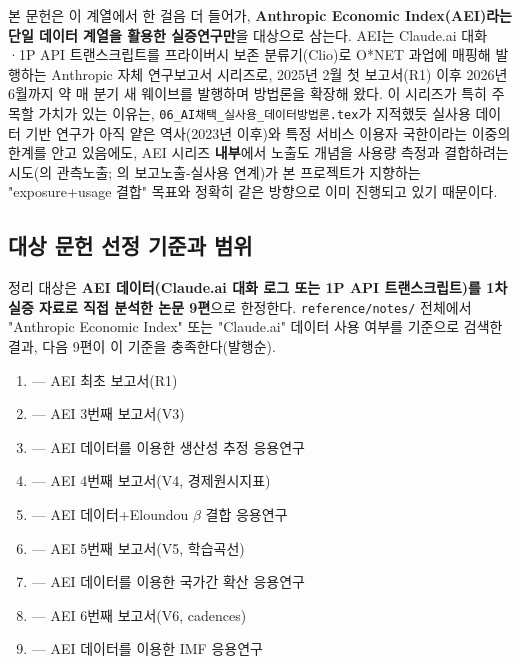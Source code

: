 \documentclass[11pt]{article}
\begin{document}
본 문헌은 이 계열에서 한 걸음 더 들어가, \textbf{Anthropic Economic Index(AEI)라는 단일 데이터 계열을 활용한 실증연구만}을 대상으로 삼는다. AEI는 Claude.ai 대화·1P API 트랜스크립트를 프라이버시 보존 분류기(Clio)로 O*NET 과업에 매핑해 발행하는 Anthropic 자체 연구보고서 시리즈로, 2025년 2월 첫 보고서(R1) 이후 2026년 6월까지 약 매 분기 새 웨이브를 발행하며 방법론을 확장해 왔다. 이 시리즈가 특히 주목할 가치가 있는 이유는, \texttt{06\_AI채택\_실사용\_데이터방법론.tex}가 지적했듯 실사용 데이터 기반 연구가 아직 얕은 역사(2023년 이후)와 특정 서비스 이용자 국한이라는 이중의 한계를 안고 있음에도, AEI 시리즈 \textbf{내부}에서 노출도 개념을 사용량 측정과 결합하려는 시도(\citealp{massenkoff-2026-labor-market-impacts-of-ai}의 관측노출; \citealp{massenkoff-2026-cadences}의 보고노출-실사용 연계)가 본 프로젝트가 지향하는 "exposure+usage 결합" 목표와 정확히 같은 방향으로 이미 진행되고 있기 때문이다.

\subsection{대상 문헌 선정 기준과 범위}

정리 대상은 \textbf{AEI 데이터(Claude.ai 대화 로그 또는 1P API 트랜스크립트)를 1차 실증 자료로 직접 분석한 논문 9편}으로 한정한다. \texttt{reference/notes/} 전체에서 "Anthropic Economic Index" 또는 "Claude.ai" 데이터 사용 여부를 기준으로 검색한 결과, 다음 9편이 이 기준을 충족한다(발행순).

\begin{enumerate}[label=(\arabic*)]
  \item \citet{handa-2025-which-economic-tasks-are} --- AEI 최초 보고서(R1)
  \item \citet{appel-2025-uneven-geographic-and-enterprise-ai} --- AEI 3번째 보고서(V3)
  \item \citet{tamkin-2025-estimating-ai-productivity-gains-from} --- AEI 데이터를 이용한 생산성 추정 응용연구
  \item \citet{appel-2026-economic-primitives} --- AEI 4번째 보고서(V4, 경제원시지표)
  \item \citet{massenkoff-2026-labor-market-impacts-of-ai} --- AEI 데이터+Eloundou $\beta$ 결합 응용연구
  \item \citet{massenkoff-2026-learning-curves} --- AEI 5번째 보고서(V5, 학습곡선)
  \item \citet{fan-2026-what-countries-use-ai-and} --- AEI 데이터를 이용한 국가간 확산 응용연구
  \item \citet{massenkoff-2026-cadences} --- AEI 6번째 보고서(V6, cadences)
  \item \citet{fan-2026-aggregate-gains-from-ai} --- AEI 데이터를 이용한 IMF 응용연구
\end{enumerate}
\end{document}
